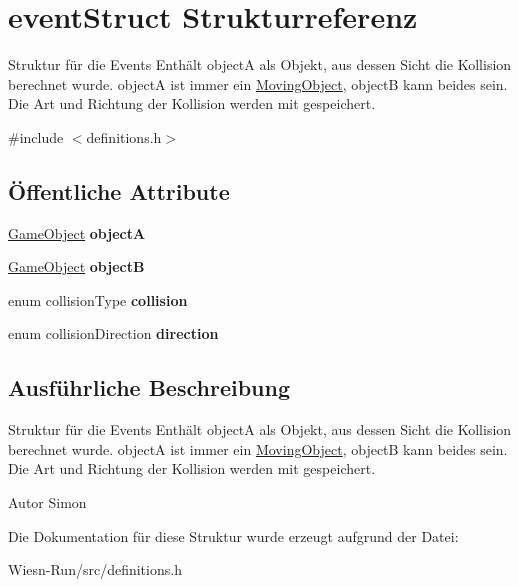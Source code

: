 \hypertarget{structeventStruct}{\section{event\-Struct Strukturreferenz}
\label{structeventStruct}
}


Struktur für die Events Enthält object\-A als Objekt, aus dessen Sicht die Kollision berechnet wurde. object\-A ist immer ein \hyperlink{classMovingObject}{Moving\-Object}, object\-B kann beides sein. Die Art und Richtung der Kollision werden mit gespeichert.  




{\ttfamily \#include $<$definitions.\-h$>$}

\subsection*{Öffentliche Attribute}
\begin{DoxyCompactItemize}
\item 
\hypertarget{structeventStruct_aa8c0da4707f8c8a8c750e07c97d4de22}{\hyperlink{classGameObject}{Game\-Object} {\bfseries object\-A}}\label{structeventStruct_aa8c0da4707f8c8a8c750e07c97d4de22}

\item 
\hypertarget{structeventStruct_af30f5189c083e03fb4b55477f30df7db}{\hyperlink{classGameObject}{Game\-Object} {\bfseries object\-B}}\label{structeventStruct_af30f5189c083e03fb4b55477f30df7db}

\item 
\hypertarget{structeventStruct_a4fc24ec95611cc3aebca2e2f84fb3551}{enum collision\-Type {\bfseries collision}}\label{structeventStruct_a4fc24ec95611cc3aebca2e2f84fb3551}

\item 
\hypertarget{structeventStruct_ada2513a58c2804a3d18345f895e43815}{enum collision\-Direction {\bfseries direction}}\label{structeventStruct_ada2513a58c2804a3d18345f895e43815}

\end{DoxyCompactItemize}


\subsection{Ausführliche Beschreibung}
Struktur für die Events Enthält object\-A als Objekt, aus dessen Sicht die Kollision berechnet wurde. object\-A ist immer ein \hyperlink{classMovingObject}{Moving\-Object}, object\-B kann beides sein. Die Art und Richtung der Kollision werden mit gespeichert. 

\begin{DoxyAuthor}{Autor}
Simon 
\end{DoxyAuthor}


Die Dokumentation für diese Struktur wurde erzeugt aufgrund der Datei\-:\begin{DoxyCompactItemize}
\item 
Wiesn-\/\-Run/src/definitions.\-h\end{DoxyCompactItemize}
